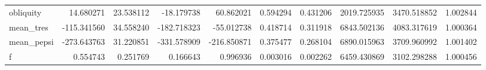 \begin{tabular}{lrrrrrrrrr}
obliquity     &   14.680271 &  23.538112 &  -18.179738 &   60.862021 &   0.594294 &  0.431206 &  2019.725935 &  3470.518852 &  1.002844 \\
mean\_tres     & -115.341560 &  34.558240 & -182.718323 &  -55.012738 &   0.418714 &  0.311918 &  6843.502136 &  4083.317619 &  1.000364 \\
mean\_pepsi    & -273.643763 &  31.220851 & -331.578909 & -216.850871 &   0.375477 &  0.268104 &  6890.015963 &  3709.960992 &  1.001402 \\
f             &    0.554743 &   0.251769 &    0.166643 &    0.996936 &   0.003016 &  0.002262 &  6459.430869 &  3102.298288 &  1.000456 \\
\bottomrule
\end{tabular}
